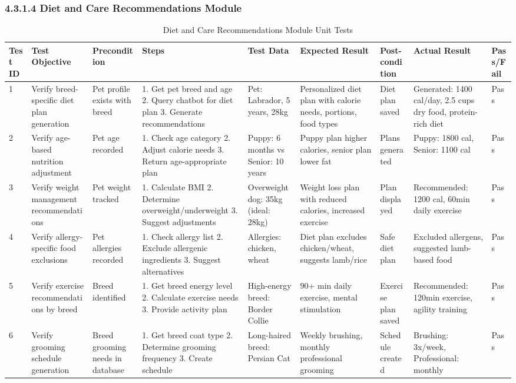 \subsubsection{4.3.1.4 Diet and Care Recommendations Module}

\begin{table}[H]
\centering
\caption{Diet and Care Recommendations Module Unit Tests}
\tiny
\begin{tabular}{|p{0.4cm}|p{2cm}|p{1.2cm}|p{2cm}|p{2cm}|p{2cm}|p{1.5cm}|p{2cm}|p{0.7cm}|}
\hline
\textbf{Test ID} & \textbf{Test Objective} & \textbf{Precondition} & \textbf{Steps} & \textbf{Test Data} & \textbf{Expected Result} & \textbf{Post-condition} & \textbf{Actual Result} & \textbf{Pass/Fail} \\ \hline
1 & Verify breed-specific diet plan generation & Pet profile exists with breed & 1. Get pet breed and age 2. Query chatbot for diet plan 3. Generate recommendations & Pet: Labrador, 5 years, 28kg & Personalized diet plan with calorie needs, portions, food types & Diet plan saved & Generated: 1400 cal/day, 2.5 cups dry food, protein-rich diet & Pass \\ \hline
2 & Verify age-based nutrition adjustment & Pet age recorded & 1. Check age category 2. Adjust calorie needs 3. Return age-appropriate plan & Puppy: 6 months vs Senior: 10 years & Puppy plan higher calories, senior plan lower fat & Plans generated & Puppy: 1800 cal, Senior: 1100 cal & Pass \\ \hline
3 & Verify weight management recommendations & Pet weight tracked & 1. Calculate BMI 2. Determine overweight/underweight 3. Suggest adjustments & Overweight dog: 35kg (ideal: 28kg) & Weight loss plan with reduced calories, increased exercise & Plan displayed & Recommended: 1200 cal, 60min daily exercise & Pass \\ \hline
4 & Verify allergy-specific food exclusions & Pet allergies recorded & 1. Check allergy list 2. Exclude allergenic ingredients 3. Suggest alternatives & Allergies: chicken, wheat & Diet plan excludes chicken/wheat, suggests lamb/rice & Safe diet plan & Excluded allergens, suggested lamb-based food & Pass \\ \hline
5 & Verify exercise recommendations by breed & Breed identified & 1. Get breed energy level 2. Calculate exercise needs 3. Provide activity plan & High-energy breed: Border Collie & 90+ min daily exercise, mental stimulation & Exercise plan saved & Recommended: 120min exercise, agility training & Pass \\ \hline
6 & Verify grooming schedule generation & Breed grooming needs in database & 1. Get breed coat type 2. Determine grooming frequency 3. Create schedule & Long-haired breed: Persian Cat & Weekly brushing, monthly professional grooming & Schedule created & Brushing: 3x/week, Professional: monthly & Pass \\ \hline
\end{tabular}
\label{tab:diet_tests}
\end{table}

